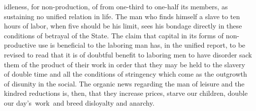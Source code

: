 \documentclass[twoside,symmetric,nobib,justified]{tufte-book}
\begin{document}
idleness, for non-production, of from one-third to one-half its members,
as sustaining no unified relation in life. The man who finds himself a
slave to ten hours of labor, when five should be his limit, sees his
bondage directly in these conditions of betrayal of the State. The claim
that capital in its forms of non-productive use is beneficial to the
laboring man has, in the unified report, to be revised to read that it
is of doubtful benefit to laboring men to have disorder sack them of the
product of their work in order that they may be held to the slavery of
double time and all the conditions of stringency which come as the
outgrowth of disunity in the social. The organic news regarding the man
of leisure and the kindred reductions is, then, that they increase
prices, starve our children, double our day's~work~and breed disloyalty
and anarchy.~
\end{document}
